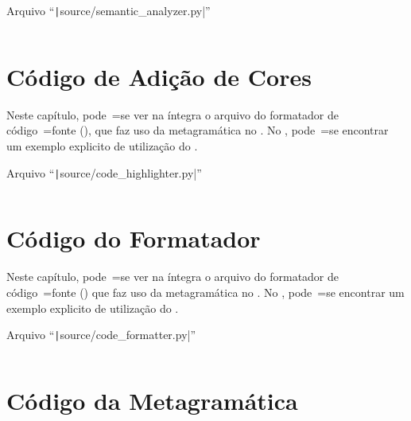 \begin{code}
\caption[Arquivo ``source/semantic\_analyzer.py'']{Arquivo ``\texttt|source/semantic_analyzer.py|''}
\label{code:semanticAnalyzerPy}
\inputminted[firstline=39,firstnumber=1]{python3}{../source/semantic_analyzer.py}
\end{code}


\chapter{Código de Adição de Cores}

Neste capítulo,
pode~=se ver na íntegra o arquivo do formatador de código~=fonte (),
que faz uso da metagramática no .
No ,
pode~=se encontrar um exemplo explicito de utilização do .
\begin{code}
\caption[Arquivo ``source/code\_highlighter.py'']{Arquivo ``\texttt|source/code_highlighter.py|''}
\label{code:codeHighlighterPy}
\inputminted[firstline=39,firstnumber=1]{python3}{../source/code_highlighter.py}
\end{code}


\chapter{Código do Formatador}
\label{chapter:codigoDoFormatador}

Neste capítulo,
pode~=se ver na íntegra o arquivo do formatador de código~=fonte () que faz uso da metagramática no .
No ,
pode~=se encontrar um exemplo explicito de utilização do .
\begin{code}
\caption[Arquivo ``source/code\_formatter.py'']{Arquivo ``\texttt|source/code_formatter.py|''}
\label{code:codeFormatterPy}
\inputminted[firstline=39,firstnumber=1]{python3}{../source/code_formatter.py}
\end{code}


\chapter{Código da Metagramática}
\label{chapter:codigoDaMetagramatica}

